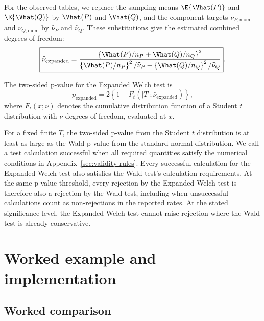 \begin{samepage}
For the observed tables, we replace the sampling
means \(\E\{\Vhat(P)\}\) and \(\E\{\Vhat(Q)\}\) by \(\Vhat(P)\) and
\(\Vhat(Q)\), and the component targets \(\nu_{P,\mathrm{mom}}\) and
\(\nu_{Q,\mathrm{mom}}\) by \(\widehat\nu_P\) and \(\widehat\nu_Q\).
These substitutions give the estimated combined degrees of freedom:
\begin{equation}
  \boxed{
  \widehat\nu_{\mathrm{expanded}}
  =
  \frac{
  \left\{\Vhat(P)/n_P+\Vhat(Q)/n_Q\right\}^2
  }{
  \left\{\Vhat(P)/n_P\right\}^2/\widehat\nu_P
  +
  \left\{\Vhat(Q)/n_Q\right\}^2/\widehat\nu_Q
  }
  }.
  \label{eq:expanded-df}
\end{equation}
\par
\end{samepage}
The two-sided p-value for the Expanded Welch test is
\begin{equation}
  p_{\mathrm{expanded}}
  =2\left\{1-F_t(|T|;\widehat\nu_{\mathrm{expanded}})\right\},
  \label{eq:expanded-p}
\end{equation}
where \(F_t(x;\nu)\) denotes the cumulative distribution function of a
Student \(t\) distribution with \(\nu\) degrees of freedom, evaluated at \(x\).

For a fixed finite \(T\), the two-sided p-value from the Student \(t\)
distribution is at least as large as the Wald p-value from the standard
normal distribution.
We call a test calculation successful when all required quantities satisfy
the numerical conditions in Appendix~\ref{sec:validity-rules}. Every
successful calculation for the Expanded Welch test also satisfies the Wald test's
calculation requirements. At the same p-value threshold, every rejection by the
Expanded Welch test is therefore also a rejection by the Wald test, including when unsuccessful calculations
count as non-rejections in the reported rates. At the stated significance
level, the Expanded Welch test cannot raise rejection where the Wald test is already
conservative.

\section{Worked example and implementation}

\subsection{Worked comparison}

